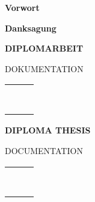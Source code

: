\begin{center}
\begin{huge}
\textbf{Vorwort}
\end{huge}
\end{center}

\bigskip
{}


\newpage
\thispagestyle{empty}
\mbox{}
\newpage

\begin{center}
\begin{huge}
\textbf{Danksagung}
\end{huge}
\end{center}

\vspace{2cm}


\newpage
\thispagestyle{empty}
\mbox{}
\newpage


\centering
\begin{huge}
\textbf{DIPLOMARBEIT}
\end{huge}

\begin{large}
DOKUMENTATION
\end{large}

\begin{tabular}{|l|l|l|}
\hline
 &  &  \\ \hline
 &  &  \\ \hline
 &  &  \\ \hline
 &  &  \\ \hline
 &  &  \\ \hline
 &  &  \\ \hline
 &  &  \\ \hline
 &  &  \\ \hline
 &  &  \\ \hline
\end{tabular}


\newpage
\centering
\begin{huge}
\textbf{DIPLOMA THESIS}
\end{huge}

\begin{large}
DOCUMENTATION
\end{large}

\begin{tabular}{|l|l|l|}
\hline
 &  &  \\ \hline
 &  &  \\ \hline
 &  &  \\ \hline
 &  &  \\ \hline
 &  &  \\ \hline
 &  &  \\ \hline
 &  &  \\ \hline
 &  &  \\ \hline
 &  &  \\ \hline
\end{tabular}

